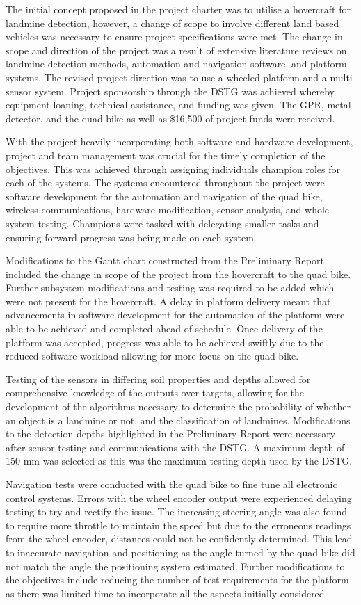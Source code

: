 \documentclass[main.tex]{subfiles}
\begin{document}
The initial concept proposed in the project charter was to utilise a hovercraft for landmine detection, however, a change of scope to involve different land based vehicles was necessary to ensure project specifications were met. The change in scope and direction of the project was a result of extensive literature reviews on landmine detection methods, automation and navigation software, and platform systems. The revised project direction was to use a wheeled platform and a multi sensor system. Project sponsorship through the DSTG was achieved whereby equipment loaning, technical assistance, and funding was given. The GPR, metal detector, and the quad bike as well as \$16,500 of project funds were received.

With the project heavily incorporating both software and hardware development, project and team management was crucial for the timely completion of the objectives. This was achieved through assigning individuals champion roles for each of the systems. The systems encountered throughout the project were software development for the automation and navigation of the quad bike, wireless communications, hardware modification, sensor analysis, and whole system testing. Champions were tasked with delegating smaller tasks and ensuring forward progress was being made on each system.

Modifications to the Gantt chart constructed from the Preliminary Report included the change in scope of the project from the hovercraft to the quad bike. Further subsystem modifications and testing was required to be added which were not present for the hovercraft. A delay in platform delivery meant that advancements in software development for the automation of the platform were able to be achieved and completed ahead of schedule. Once delivery of the platform was accepted, progress was able to be achieved swiftly due to the reduced software workload allowing for more focus on the quad bike.

Testing of the sensors in differing soil properties and depths allowed for comprehensive knowledge of the outputs over targets, allowing for the development of the algorithms necessary to determine the probability of whether an object is a landmine or not, and the classification of landmines. Modifications to the detection depths highlighted in the Preliminary Report were necessary after sensor testing and communications with the DSTG. A maximum depth of 150 mm was selected as this was the maximum testing depth used by the DSTG. 

Navigation tests were conducted with the quad bike to fine tune all electronic control systems. Errors with the wheel encoder output were experienced delaying testing to try and rectify the issue. The increasing steering angle was also found to require more throttle to maintain the speed but due to the erroneous readings from the wheel encoder, distances could not be confidently determined. This lead to inaccurate navigation and positioning as the angle turned by the quad bike did not match the angle the positioning system estimated. Further modifications to the objectives include reducing the number of test requirements for the platform as there was limited time to incorporate all the aspects initially considered.  
\end{document}
